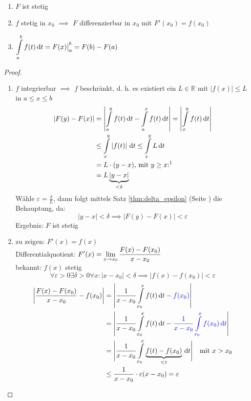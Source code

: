 \begin{theorem}
  \begin{enumerate}
    \item $F$ ist stetig
    \item $f$ stetig in $x_0$ $\implies$ $F$ differenzierbar in $x_0$ mit $F'(x_0) = f(x_0)$
    \item $\displaystyle \int\limits_a^b f(t)\,\mathrm d t = F(x)\big|_a^b = F(b) - F(a)$
  \end{enumerate}
\end{theorem}

\begin{proof}
  \begin{enumerate}
    \item $f$ integrierbar $\implies$ $f$ beschränkt, d. h. es existiert ein $L \in \mathbb R$ mit $\left|f(x)\right| \leq L$ in $a\leq x \leq b$
      \begin{align*}
        \left| F(y) - F(x) \right| &= \left| \int\limits_a^y f(t)\,\diff t - \int\limits_a^x f(t)\,\diff t \right|
        = \left| \int\limits_x^y f(t)\,\diff t \right| \\
        &\leq \int\limits_x^y \left| f(t) \right| \,\diff t
        \leq \int\limits_x^y L\,\diff t\\
        &= L\cdot (y-x) \text{, mit $y \geq x$:\footnotemark} \\
        &= L \underbrace{\left|y - x\right|}_{< \delta}
      \end{align*}
      Wähle $\varepsilon = \frac \delta L$, dann folgt mittels Satz \ref{thm:delta_epsilon} (Seite \pageref{thm:delta_epsilon}) die Behauptung, da:
      \[ \left| y - x \right| < \delta \implies \left| F(y) - F(x) \right| < \varepsilon \]
      Ergebnis: $F$ ist stetig
    \item zu zeigen: $F'(x) = f(x)$\\
      Differentialquotient: $\displaystyle F'(x)= \lim_{x \to x_0}\frac{F(x)-F(x_0)}{x-x_0}$\\
      bekannt: $f(x)$ stetig
      \[ \forall \varepsilon > 0 \exists \delta > 0 \forall x: \left| x - x_0 \right| < \delta \implies \left| f(x) - f(x_0) \right| < \varepsilon \]
      \begin{align*}
        \left| \frac{F(x)-F(x_0)}{x-x_0} - f(x_0) \right|
        &= \left| \frac{1}{x-x_0} \int\limits_{x_0}^x f(t)\,\mathrm d t - \textcolor{blue}{f(x_0)} \right|\\
        &= \left| \frac{1}{x-x_0} \int\limits_{x_0}^x f(t)\,\mathrm d t - \textcolor{blue}{\frac 1 {x-x_0} \int\limits_{x_0}^x f(x_0)\,\mathrm d t} \right| \\
        &= \Biggl| \frac{1}{x-x_0} \int\limits_{x_0}^x \underbrace{f(t) - f(x_0)}_{< \varepsilon} \,\mathrm d t \Biggr| \quad\text{mit }x>x_0\\
        &\leq \frac{1}{x-x_0} \cdot \varepsilon (x-x_0) = \varepsilon
      \end{align*}
  \end{enumerate}
\end{proof}

